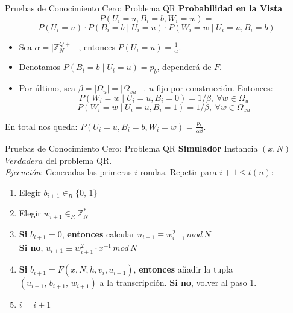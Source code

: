 \documentclass{beamer}
\begin{document}
\begin{frame}{Pruebas de Conocimiento Cero: Problema QR}
	\textbf{Probabilidad en la Vista}
	\[
	P(U_i=u, B_i=b, W_i=w) = 
	\]
	\[ P(U_i=u)\cdot P(B_i=b \mid U_i=u) \cdot P(W_i=w \mid U_i=u, B_i=b) \]
	
	\begin{itemize}
		\item Sea $\alpha = \mid \mathbb{Z}^{Q+}_N \mid $, entonces $P(U_i=u) = \frac{1}{\alpha}$.
		
		\item Denotamos $ P(B_i=b \mid U_i=u)=p_b$, dependerá de $F$.
		
		\item Por último, sea $\beta = \mid \Omega_u \mid = \mid \Omega_{xu} \mid $. $u$ fijo por construcción. Entonces:
		\[P(W_i=w \mid U_i=u, B_i=0) = 1/\beta,\ \forall w \in \Omega_u\]
		\[P(W_i=w \mid U_i=u, B_i=1) = 1/\beta,\ \forall w \in \Omega_{xu}\]
	\end{itemize}
	
	En total nos queda: $P(U_i=u, B_i=b, W_i=w) = \frac{p_b}{\alpha \beta}$.
\end{frame}

\begin{frame}{Pruebas de Conocimiento Cero: Problema QR}
	\textbf{Simulador} Instancia $(x,N)$ $Verdadera$ del problema QR.\\
	\textit{Ejecución}: Generadas las primeras $i$ rondas. Repetir para $i+1 \leq t(n)$:
	
	\begin{enumerate}
		\item Elegir $b_{i+1} \in_R \{0,\,1\}$
		
		\item Elegir $w_{i+1} \in_R \mathbb{Z}^*_N$
		
		\item \textbf{Si} $b_{i+1} = 0$, \textbf{entonces} calcular \qquad $u_{i+1} \equiv w_{i+1}^2 \, mod \,  N$ \\
		\textbf{Si no}, \qquad \qquad \qquad \qquad \qquad \qquad \: $u_{i+1} \equiv w_{i+1}^2 \cdot x^{-1} \, mod \,  N$
		
		\item \textbf{Si} $b_{i+1} = F(x,N,h,v_i,u_{i+1})$, \textbf{entonces} añadir la tupla \\ $(u_{i+1},\,b_{i+1},\,w_{i+1})$ a la transcripción. \textbf{Si no}, volver al paso 1.
		
		\item $i = i+1$
		
	\end{enumerate}
\end{frame}
\end{document}
